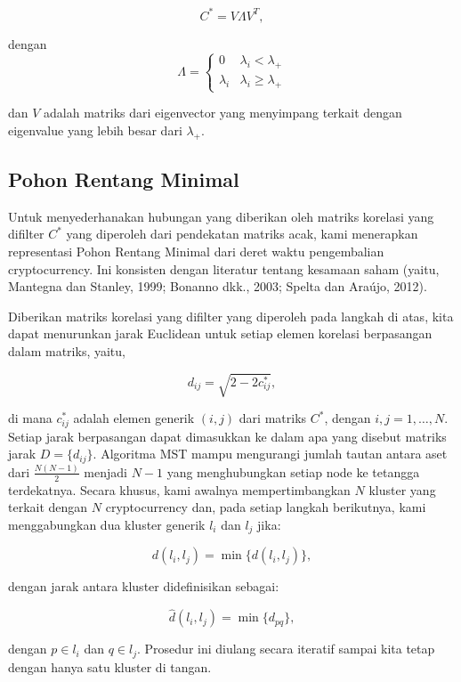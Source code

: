 \documentclass[12pt,a4paper]{article}
\begin{document}
\begin{equation}
C^* = V\Lambda V^T,
\end{equation}

dengan 
\[
\Lambda = 
\begin{cases}
0 & \lambda_i < \lambda_+ \\
\lambda_i & \lambda_i \geq \lambda_+
\end{cases}
\]

dan $V$ adalah matriks dari eigenvector yang menyimpang terkait dengan eigenvalue yang lebih besar dari $\lambda_+$.

\subsection{Pohon Rentang Minimal}

Untuk menyederhanakan hubungan yang diberikan oleh matriks korelasi yang difilter $C^*$ yang diperoleh dari pendekatan matriks acak, kami menerapkan representasi Pohon Rentang Minimal dari deret waktu pengembalian cryptocurrency. Ini konsisten dengan literatur tentang kesamaan saham (yaitu, Mantegna dan Stanley, 1999\cite{mantegna1999b}; Bonanno dkk., 2003\cite{bonanno2003}; Spelta dan Araújo, 2012\cite{spelta2012}).

Diberikan matriks korelasi yang difilter yang diperoleh pada langkah di atas, kita dapat menurunkan jarak Euclidean untuk setiap elemen korelasi berpasangan dalam matriks, yaitu,

\begin{equation}
d_{ij} = \sqrt{2 - 2c_{ij}^*},
\end{equation}

di mana $c_{ij}^*$ adalah elemen generik $(i, j)$ dari matriks $C^*$, dengan $i, j = 1, \ldots, N$. Setiap jarak berpasangan dapat dimasukkan ke dalam apa yang disebut matriks jarak $D = \{d_{ij}\}$. Algoritma MST mampu mengurangi jumlah tautan antara aset dari $\frac{N(N-1)}{2}$ menjadi $N - 1$ yang menghubungkan setiap node ke tetangga terdekatnya. Secara khusus, kami awalnya mempertimbangkan $N$ kluster yang terkait dengan $N$ cryptocurrency dan, pada setiap langkah berikutnya, kami menggabungkan dua kluster generik $l_i$ dan $l_j$ jika:

\[
d(l_i, l_j) = \min\{d(l_i, l_j)\},
\]

dengan jarak antara kluster didefinisikan sebagai:

\[
\hat{d}(l_i, l_j) = \min\{d_{pq}\},
\]

dengan $p \in l_i$ dan $q \in l_j$. Prosedur ini diulang secara iteratif sampai kita tetap dengan hanya satu kluster di tangan.
\end{document}

